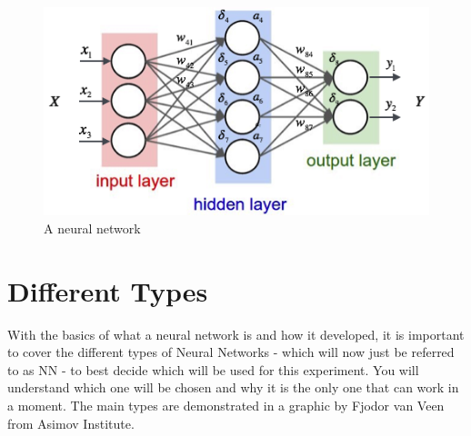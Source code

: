 \documentclass[12pt]{article}
\begin{document}
\begin{figure}[H]
  \includegraphics[width=\linewidth]{images/nn.png}
  \caption{A neural network \cite{valkov_2017}}
\end{figure}

\section{Different Types}
\quad With the basics of what a neural network is and how it developed, it is important to cover the different types of Neural Networks - which will now just be referred to as NN - to best decide which will be used for this experiment. You will understand which one will be chosen and why it is the only one that can work in a moment. The main types are demonstrated in a graphic by Fjodor van Veen from Asimov Institute.  \cite{maladkar_2018}
\end{document}
